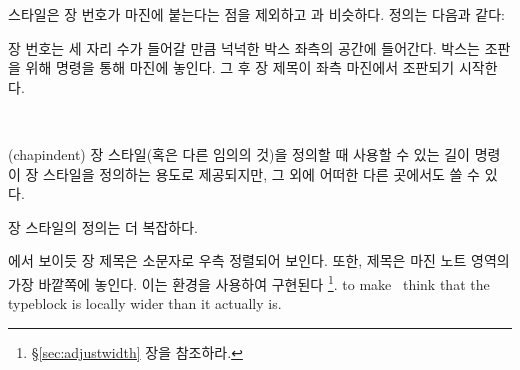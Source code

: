  스타일은 장 번호가 마진에 붙는다는 점을 제외하고
 과 비슷하다.
정의는 다음과 같다:
\begin{lcode}
\end{lcode}
장 번호는 세 자리 수가 들어갈 만큼 넉넉한 박스 좌측의 공간에 들어간다.
박스는 조판을 위해 \cmd{\llap} 명령을 통해 마진에 놓인다.
그 후 장 제목이 좌측 마진에서 조판되기 시작한다.

\begin{syntax}
\lnc{\chapindent} \\
\end{syntax}
\glossary(chapindent)%
  {}%
  {장 스타일(혹은 다른 임의의 것)을 정의할 때 사용할 수 있는 길이}
\lnc{\chapindent} 명령이 장 스타일을 정의하는 용도로 제공되지만,
그 외에 어떠한 다른 곳에서도 쓸 수 있다.

 장 스타일의 정의는 더 복잡하다.
\begin{lcode}
\end{lcode}
에서 보이듯 장 제목은 소문자로 우측 정렬되어 보인다.
또한, 제목은 마진 노트 영역의 가장 바깥쪽에 놓인다.
이는  환경을 사용하여 구현된다 \footnote{\S\ref{sec:adjustwidth} 장을 참조하라.}.
to make \ltx\ think that the typeblock is locally wider than it actually is.

